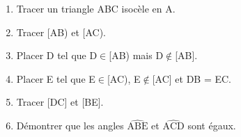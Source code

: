 \documentclass[exercice]{thedocument}%
\begin{document}
%
\begin{enumerate}
    \item Tracer un triangle ABC isocèle en A.
    \item Tracer [AB) et [AC).
    \item Placer D tel que D$\in$[AB) mais D$\notin$[AB].
    \item Placer E tel que E$\in$[AC), E$\notin$[AC] et DB = EC.
    \item Tracer [DC] et [BE].
    \item Démontrer que les angles $\widehat{\text{ABE}}$ et $\widehat{\text{ACD}}$
    sont égaux.
\end{enumerate}
\end{document}
